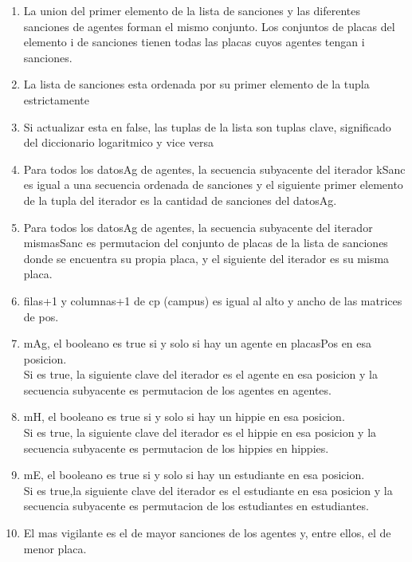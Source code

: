 \begin{Representacion}
\begin{enumerate}
		\item La union del primer elemento de la lista de sanciones y las diferentes sanciones de agentes forman el mismo conjunto. Los conjuntos de placas del elemento i de sanciones tienen todas las placas cuyos agentes tengan i sanciones.
		\item La lista de sanciones esta ordenada por su primer elemento de la tupla estrictamente
		\item Si actualizar esta en false, las tuplas de la lista son tuplas clave, significado del diccionario logaritmico y vice versa		
		
		\item Para todos los datosAg de agentes, la secuencia subyacente del iterador kSanc es igual a una secuencia ordenada de sanciones y el siguiente primer elemento de la tupla del iterador es la cantidad de sanciones del datosAg.
		\item Para todos los datosAg de agentes, la secuencia subyacente del iterador mismasSanc es permutacion del conjunto de placas de la lista de sanciones donde se encuentra su propia placa, y el siguiente del iterador es su misma placa.
		\item filas+1 y columnas+1 de cp (campus) es igual al alto y ancho de las matrices de pos.
		\item mAg, el booleano es true si y solo si hay un agente en placasPos en esa posicion.\\
		Si es true, la siguiente clave del iterador es el agente en esa posicion y la secuencia subyacente es permutacion de los agentes en agentes.
		\item mH, el booleano es true si y solo si hay un hippie en esa posicion.\\
		Si es true, la siguiente clave del iterador es el hippie en esa posicion y la secuencia subyacente es permutacion de los hippies en hippies.
		\item mE, el booleano es true si y solo si hay un estudiante en esa posicion.\\
		Si es true,la siguiente clave del iterador es el estudiante en esa posicion y la secuencia subyacente es permutacion de los estudiantes en estudiantes.
		\item El mas vigilante es el de mayor sanciones de los agentes y, entre ellos, el de menor placa.
	\end{enumerate}
	

\end{Representacion}
